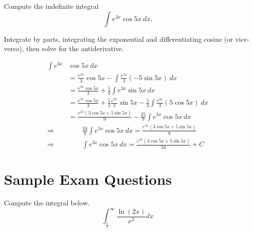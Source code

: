\documentclass{ximera}
\begin{document}
\begin{question}%

Compute the indefinite integral 
\[\int e^{3x}  \cos 5x ~ dx.\]
\begin{multiplechoice}
\end{multiplechoice}
\begin{feedback}
Integrate by parts, integrating the exponential and differentiating cosine (or vice-versa), then solve for the antiderivative.
\begin{hint}
\[ \begin{aligned}
    \int e^{3x} & \cos 5x ~ dx \\
    & = \frac{e^{3x}}{3} \cos 5x - \int \frac{e^{3x}}{3} (-5 \sin 5x) ~ dx \\
    & = \frac{e^{3x} \cos 5x}{3} + \frac{5}{3} \int e^{3x} \sin 5x ~ dx \\
    & = \frac{e^{3x} \cos 5x}{3} + \frac{5}{3} \frac{e^{3x}}{3} \sin 5x - \frac{5}{3} \int \frac{e^{3x}}{3} (5 \cos 5x) ~ dx \\
    & = \frac{e^{3x} (3 \cos 5x + 5 \sin 5x)}{9} - \frac{25}{9} \int e^{3x} \cos 5x ~ dx  \\
    \Rightarrow   & \qquad \frac{34}{9}  \int e^{3x}  \cos 5x ~ dx  = \frac{e^{3x} (3 \cos 5x + 5 \sin 5x)}{9} \\
    \Rightarrow & \qquad  \int  e^{3x}  \cos 5x ~ dx = \frac{e^{3x} (3 \cos 5x + 5 \sin 5x)}{34} + C
\end{aligned}\]
\end{hint}
\end{feedback}

\end{question}

\section*{Sample Exam Questions}

\begin{question}%

Compute the integral below.
\[ \int_{\frac{1}{2}}^\infty \frac{ \ln (2x)}{x^2} dx \]
\begin{multiplechoice}
\end{multiplechoice}

\end{question}
\end{document}
